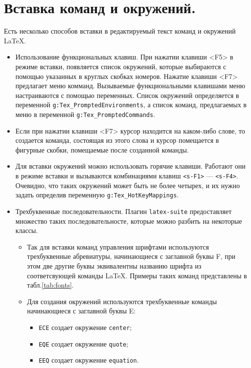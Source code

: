 \documentclass[a4paper]{article}
\begin{document}
\part{Вставка команд и окружений.}\label{part:insert}
Есть несколько способов вставки в редактируемый текст команд и окружений \LaTeX.
\begin{itemize}
	\item\sloppy Использование функциональных клавиш. При нажатии клавиши <F5> в режиме
		вставки, появляется список окружений, которые выбираются с помощью 
		указанных в круглых скобках номеров. Нажатие клавиши <F7> предлагает 
		меню комманд. Вызываемые функциональными клавишами меню настраиваются с
		помощью переменных. Список окружений определяется в переменной \verb|g:Tex_PromptedEnvironments|,
		а список команд, предлагаемых в меню в переменной 
		\verb|g:Tex_PromptedCommands|.
	\item Если при нажатии клавиши <F7> курсор находится на каком-либо слове, 
		то создается команда, состоящая из этого слова и курсор помещается в
		фигурные скобки, помещаемые после созданной команды. 
	\item Для вставки окружений можно использовать горячие клавиши. Работают они 
		в режиме вставки и вызываются комбинациями клавиш \texttt{<s-F1>} --- \texttt{<s-F4>}.
		Очевидно, что таких окружений может быть не более четырех, и их нужно 
		задать определив переменную \verb|g:Tex_HotKeyMappings|.
	\item Трехбуквенные последовательности. Плагин \texttt{latex-suite} предоставляет
		множество таких последовательносте, которые можно разбить на некоторые классы.
		\begin{itemize}
			\item 
		Так для вставки команд управления шрифтами 
		используются трехбуквенные абревиатуры, начинающиеся с заглавной буквы F, при
		этом две другие буквы эквивалентны названию шрифта из соответсвующей команды 
		\LaTeX. Примеры таких команд представлены в табл.\ref{tab:fonts}.
			\item Для создания окружений используются трехбуквенные команды начинающиеся
			  с заглавной буквы E:
			  \begin{itemize}
				  \item \texttt{ECE} создает окружение \verb|center|;
				  \item \texttt{EQE} создает окружение \verb|quote|;
				  \item \texttt{EEQ} создает окружение \verb|equation|.
			  \end{itemize}

\end{itemize}
\end{itemize}
\end{document}
